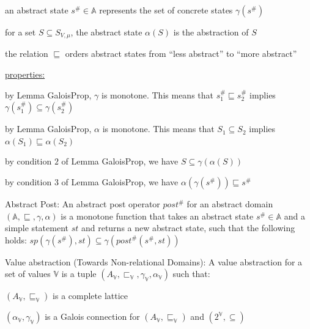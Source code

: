 \documentclass[landscape, a4paper]{article}
\begin{document}
\begin{minipage}[t]{0.2\linewidth}
\begin{betterlist}
\begin{betterlist}
\begin{betterlist}
				\item an abstract state $s^\# \in \mathbb{A}$ represents the set of concrete states $\gamma(s^\#)$
				\item for a set $S \subseteq S_{V,\mu}$, the abstract state $\alpha(S)$ is the abstraction of $S$
				\item the relation $\sqsubseteq$ orders abstract states from \enquote{less abstract} to \enquote{more abstract}
				\item \underline{properties:}
				\begin{betterlist}
					\item by Lemma GaloisProp, $\gamma$ is monotone. This means that $s^\#_1 \sqsubseteq s^\#_2$ implies $\gamma(s^\#_1) \subseteq \gamma(s^\#_2)$
					\item by Lemma GaloisProp, $\alpha$ is monotone. This means that $S_1 \subseteq S_2$ implies $\alpha(S_1) \sqsubseteq \alpha(S_2)$
					\item by condition $2$ of Lemma GaloisProp, we have $S \subseteq \gamma(\alpha(S))$
					\item by condition $3$ of Lemma GaloisProp, we have $\alpha(\gamma(s^\#)) \sqsubseteq s^\#$
				\end{betterlist}
			\end{betterlist}
			\item {}
		\end{betterlist}
		\item \alert{Abstract Post:} An \alert{abstract post operator} $post^\#$ for an abstract domain $(\mathbb{A}, \sqsubseteq, \gamma, \alpha)$ is a monotone function that takes an abstract state $s^\# \in \mathbb{A}$ and a simple statement $st$ and returns a new abstract state, such that the following holds: $sp(\gamma(s^\#), st)\subseteq \gamma(post^\#(s^\#, st))$
		\begin{betterlist}
			\item {}
			\item {}
		\end{betterlist}
		\item \alert{Value abstraction (Towards Non-relational Domains):} A value abstraction for a set of values $\mathbb{V}$ is a tuple $(A_{\mathbb{V}}, \sqsubset_{\mathbb{V}}, \gamma_{\mathbb{V}}, \alpha_{\mathbb{V}})$ such that:
		\begin{betterlist}
			\item $(A_{\mathbb{V}}, \sqsubseteq_{\mathbb{V}})$ is a complete lattice
			\item $(\alpha_{\mathbb{V}}, \gamma_{\mathbb{V}})$ is a Galois connection for $(A_{\mathbb{V}}, \sqsubseteq_{\mathbb{V}})$ and $(2^{\mathbb{V}}, \subseteq)$

\end{betterlist}
\end{betterlist}
\end{minipage}
\end{document}
